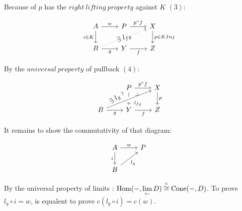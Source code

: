 \begin{prf}
            \par Because of $p$ has the $right\ lifting\ property$ against $K$ $(3)$:

            \[\begin{tikzcd}
                A & P & X \\
                B & Y & Z
                \arrow["f"', from=2-2, to=2-3]
                \arrow["{p \in K Inj}", from=1-3, to=2-3]
                \arrow["p^*f", from=1-2, to=1-3]
                \arrow["g"', from=2-1, to=2-2]
                \arrow["w", from=1-1, to=1-2]
                \arrow["{{i \in K}}"', from=1-1, to=2-1]
                \arrow["{\E \ l_{fg}}"{marking}, dotted, from=2-1, to=1-3]
            \end{tikzcd}\]

            \par By the $universal\ property$ of pullback $(4)$:

            \[\begin{tikzcd}
                & P & X \\
                B & Y & Z
                \arrow["f"', from=2-2, to=2-3]
                \arrow["p", from=1-3, to=2-3]
                \arrow[from=1-2, to=2-2]
                \arrow["p^*f", from=1-2, to=1-3]
                \arrow["g"', from=2-1, to=2-2]
                \arrow["{\ \ \! l_{fg}}"', from=2-1, to=1-3, crossing over]
                \arrow["{\E \ l_g}"{marking}, dotted, from=2-1, to=1-2]
                \arrow["{\big \lrcorner}"{anchor=center, pos=0.125}, draw=none, from=1-2, to=2-3]
            \end{tikzcd}\]

            \par It remains to show the commutativity of that diagram:

            \[\begin{tikzcd}
                A & P \\
                B
                \arrow["{l_{g}}"', from=2-1, to=1-2]
                \arrow["{i}"', from=1-1, to=2-1]
                \arrow["w", from=1-1, to=1-2]
            \end{tikzcd}\]

            \par By the universal property of limits :
            $\operatorname{\rm{Hom}}(-, \lim\limits_{\leftarrow} D) \overset{c}{\cong} \operatorname{Cone}(-, D)$.
            To prove $l_g \circ i = w$, is equalent to prove $c(l_g \circ i) = c(w)$.


\end{prf}
